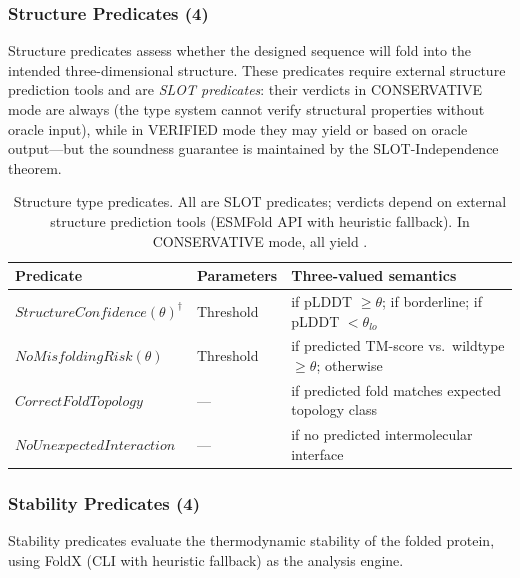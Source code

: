 \subsubsection{Structure Predicates (4)}

Structure predicates assess whether the designed sequence will fold
into the intended three-dimensional structure.
These predicates require external structure prediction tools and are
\emph{SLOT predicates}: their verdicts in CONSERVATIVE mode are always
\UNCERTAIN{} (the type system cannot verify structural properties
without oracle input), while in VERIFIED mode they may yield \PASS{}
or \FAIL{} based on oracle output---but the soundness guarantee is
maintained by the SLOT-Independence theorem.

\begin{table}[t]
\centering
\caption{Structure type predicates. All are SLOT predicates; verdicts
         depend on external structure prediction tools (ESMFold
         API with heuristic fallback). In CONSERVATIVE mode, all
         yield \UNCERTAIN.}
\label{tab:struct-predicates}
\begin{tabular}{llp{4.6cm}}
\toprule
\textbf{Predicate} & \textbf{Parameters} & \textbf{Three-valued semantics} \\
\midrule
$\mathit{StructureConfidence}(\theta)^\dagger$ & Threshold &
  \PASS{} if pLDDT $\ge \theta$; \UNCERTAIN{} if borderline;
  \FAIL{} if pLDDT $< \theta_{\mathit{lo}}$ \\
$\mathit{NoMisfoldingRisk}(\theta)$ & Threshold &
  \PASS{} if predicted TM-score vs.\ wildtype $\ge \theta$;
  \FAIL{} otherwise \\
$\mathit{CorrectFoldTopology}$ & --- &
  \PASS{} if predicted fold matches expected topology class \\
$\mathit{NoUnexpectedInteraction}$ & --- &
  \PASS{} if no predicted intermolecular interface \\
\bottomrule
\end{tabular}
\end{table}

\subsubsection{Stability Predicates (4)}

Stability predicates evaluate the thermodynamic stability of the folded
protein, using FoldX (CLI with heuristic fallback) as the analysis
engine.

